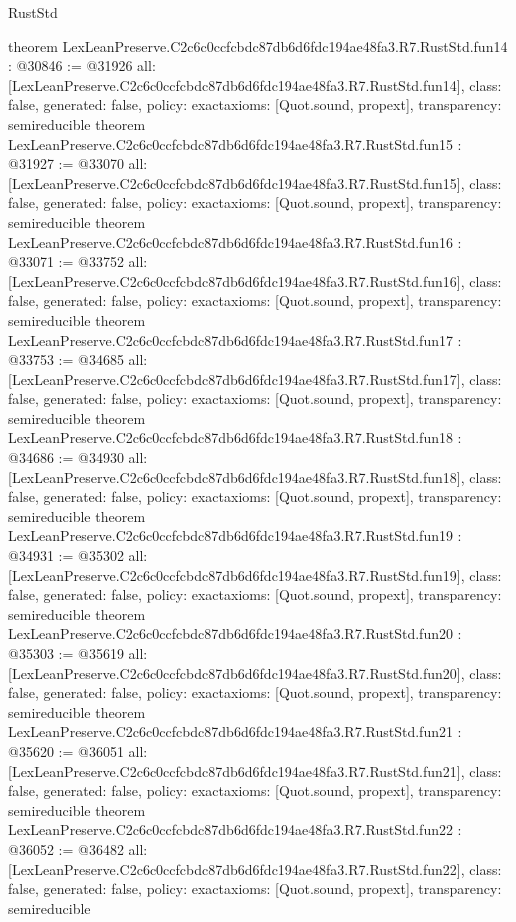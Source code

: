 \begin{lexlean}{RustStd}
\begin{coremodule}
{}
theorem LexLeanPreserve.C2c6c0ccfcbdc87db6d6fdc194ae48fa3.R7.RustStd.fun14 : @30846 := @31926 {
  all: [LexLeanPreserve.C2c6c0ccfcbdc87db6d6fdc194ae48fa3.R7.RustStd.fun14],
  class: false,
  generated: false,
  policy: exact{axioms: [Quot.sound, propext]},
  transparency: semireducible
}
theorem LexLeanPreserve.C2c6c0ccfcbdc87db6d6fdc194ae48fa3.R7.RustStd.fun15 : @31927 := @33070 {
  all: [LexLeanPreserve.C2c6c0ccfcbdc87db6d6fdc194ae48fa3.R7.RustStd.fun15],
  class: false,
  generated: false,
  policy: exact{axioms: [Quot.sound, propext]},
  transparency: semireducible
}
theorem LexLeanPreserve.C2c6c0ccfcbdc87db6d6fdc194ae48fa3.R7.RustStd.fun16 : @33071 := @33752 {
  all: [LexLeanPreserve.C2c6c0ccfcbdc87db6d6fdc194ae48fa3.R7.RustStd.fun16],
  class: false,
  generated: false,
  policy: exact{axioms: [Quot.sound, propext]},
  transparency: semireducible
}
theorem LexLeanPreserve.C2c6c0ccfcbdc87db6d6fdc194ae48fa3.R7.RustStd.fun17 : @33753 := @34685 {
  all: [LexLeanPreserve.C2c6c0ccfcbdc87db6d6fdc194ae48fa3.R7.RustStd.fun17],
  class: false,
  generated: false,
  policy: exact{axioms: [Quot.sound, propext]},
  transparency: semireducible
}
theorem LexLeanPreserve.C2c6c0ccfcbdc87db6d6fdc194ae48fa3.R7.RustStd.fun18 : @34686 := @34930 {
  all: [LexLeanPreserve.C2c6c0ccfcbdc87db6d6fdc194ae48fa3.R7.RustStd.fun18],
  class: false,
  generated: false,
  policy: exact{axioms: [Quot.sound, propext]},
  transparency: semireducible
}
theorem LexLeanPreserve.C2c6c0ccfcbdc87db6d6fdc194ae48fa3.R7.RustStd.fun19 : @34931 := @35302 {
  all: [LexLeanPreserve.C2c6c0ccfcbdc87db6d6fdc194ae48fa3.R7.RustStd.fun19],
  class: false,
  generated: false,
  policy: exact{axioms: [Quot.sound, propext]},
  transparency: semireducible
}
theorem LexLeanPreserve.C2c6c0ccfcbdc87db6d6fdc194ae48fa3.R7.RustStd.fun20 : @35303 := @35619 {
  all: [LexLeanPreserve.C2c6c0ccfcbdc87db6d6fdc194ae48fa3.R7.RustStd.fun20],
  class: false,
  generated: false,
  policy: exact{axioms: [Quot.sound, propext]},
  transparency: semireducible
}
theorem LexLeanPreserve.C2c6c0ccfcbdc87db6d6fdc194ae48fa3.R7.RustStd.fun21 : @35620 := @36051 {
  all: [LexLeanPreserve.C2c6c0ccfcbdc87db6d6fdc194ae48fa3.R7.RustStd.fun21],
  class: false,
  generated: false,
  policy: exact{axioms: [Quot.sound, propext]},
  transparency: semireducible
}
theorem LexLeanPreserve.C2c6c0ccfcbdc87db6d6fdc194ae48fa3.R7.RustStd.fun22 : @36052 := @36482 {
  all: [LexLeanPreserve.C2c6c0ccfcbdc87db6d6fdc194ae48fa3.R7.RustStd.fun22],
  class: false,
  generated: false,
  policy: exact{axioms: [Quot.sound, propext]},
  transparency: semireducible
}
\end{coremodule}
\end{lexlean}
